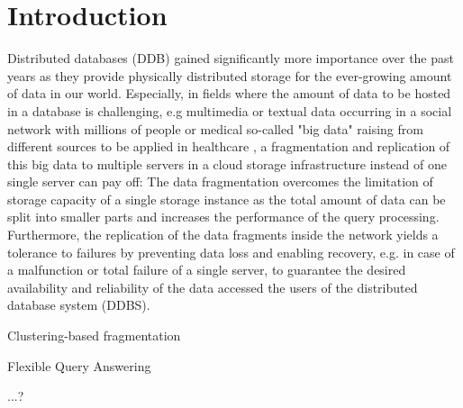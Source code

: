 
\section{Introduction}
\label{sec:intro}

Distributed databases (DDB) gained significantly more importance over the past years as they provide physically distributed storage \cite{Oszu2002, Tan2009} 
for the ever-growing amount of data in our world. Especially, in fields where the amount of data to be hosted in a database is challenging, e.g multimedia or 
textual data occurring in a social network with millions of people or medical so-called "big data" raising from different sources to be applied in 
healthcare \cite{Lee2017}, a fragmentation and replication of this big data to multiple servers in a cloud storage infrastructure instead of one single server 
can pay off:
The data fragmentation overcomes the limitation of storage capacity of a single storage instance as the total amount of data can be split into smaller parts
and increases the performance of the query processing. Furthermore, the replication of the data fragments inside the network yields a tolerance to failures by 
preventing data loss and enabling recovery, e.g. in case of a malfunction or total failure of a single server, to guarantee the desired availability and 
reliability of the data accessed the users of the distributed database system (DDBS).

Clustering-based fragmentation

Flexible Query Answering

...?